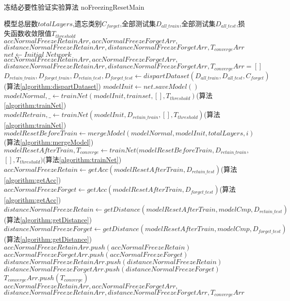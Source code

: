 \begin{algorithm}
	\renewcommand{\algorithmicrequire}{\textbf{Input:}}
	\renewcommand{\algorithmicensure}{\textbf{Output:}}
	\caption{冻结必要性验证实验算法 noFreezingResetMain}
	\label{algorithm:noFreezingResetMain}
	\begin{algorithmic}[1]
        \REQUIRE 模型总层数$totalLayers$,遗忘类别$C_{forget}$,全部测试集$D_{all\_train}$,全部测试集$D_{all\_test}$,损失函数收敛限值$T_{threshold}$
        \ENSURE  $accNormalFreezeRetainArr,accNormalFreezeForgetArr,$\\$distanceNormalFreezeRetainArr,distanceNormalFreezeForgetArr,T_{converge}Arr$
        \STATE $net \gets Initial\ Network$
        \STATE $accNormalFreezeRetainArr,accNormalFreezeForgetArr,$\\$distanceNormalFreezeRetainArr,distanceNormalFreezeForgetArr,T_{converge}Arr = []$
        \STATE $D_{retain\_train}, D_{forget\_train}, D_{retain\_test}, D_{forget\_test} \gets dispartDataset(D_{all\_train}, D_{all\_test}, C_{forget})$(算法\ref{algorithm:dispartDataset})
        \STATE $modelInit \gets net.saveModel()$
        \STATE $modelNormal,\_ \gets trainNet(modelInit, trainset, [], T_{threshold})$(算法\ref{algorithm:trainNet})
        \STATE $modelRetrain,\_ \gets trainNet(modelInit, D_{retain\_train}, [], T_{threshold})$(算法\ref{algorithm:trainNet})
            \STATE $modelResetBeforeTrain \gets mergeModel(modelNormal, modelInit, totalLayers, i)$(算法\ref{algorithm:mergeModel})
            \STATE $modelResetAfterTrain,T_{converge} \gets trainNet(modelResetBeforeTrain , D_{retain\_train},$\\$ [], T_{threshold})$(算法\ref{algorithm:trainNet})
            \STATE $accNormalFreezeRetain \gets getAcc(modelResetAfterTrain, D_{retain\_test})$(算法\ref{algorithm:getAcc})
            \STATE $accNormalFreezeForget  \gets getAcc(modelResetAfterTrain, D_{forget\_test})$(算法\ref{algorithm:getAcc})
            \STATE $distanceNormalFreezeRetain \gets getDistance(modelResetAfterTrain, modelCmp, D_{retain\_test})$(算法\ref{algorithm:getDistance})
            \STATE $distanceNormalFreezeForget \gets getDistance(modelResetAfterTrain, modelCmp, D_{forget\_test})$(算法\ref{algorithm:getDistance})
            \STATE $accNormalFreezeRetainArr.push(accNormalFreezeRetain)$
            \STATE $accNormalFreezeForgetArr.push(accNormalFreezeForget)$
            \STATE $distanceNormalFreezeRetainArr.push(distanceNormalFreezeRetain)$
            \STATE $distanceNormalFreezeForgetArr.push(distanceNormalFreezeForget)$
            \STATE $T_{converge}Arr.push(T_{converge})$
        \ENDFOR
        \RETURN $accNormalFreezeRetainArr,accNormalFreezeForgetArr,$\\$distanceNormalFreezeRetainArr,distanceNormalFreezeForgetArr,T_{converge}Arr$
	\end{algorithmic}  
\end{algorithm}

